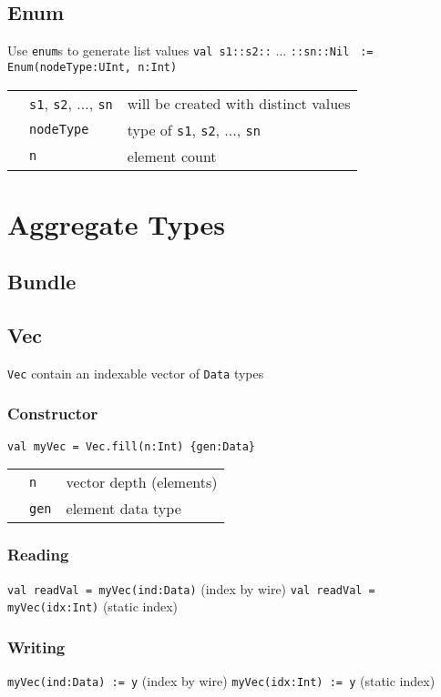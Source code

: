 \documentclass[10pt,landscape]{article}
\begin{document}
\begin{multicols}{3}
\subsection{Enum}
Use \verb$enum$s to generate list values \newline
\verb$val s1::s2::$ ... \verb$::sn::Nil$ \newline
\verb$ := Enum(nodeType:UInt, n:Int)$ \newline
\begin{tabular}{l l l}
& \verb$s1$, \verb$s2$, ..., \verb$sn$ & will be created with distinct values \\
& \verb$nodeType$ & type of \verb$s1$, \verb$s2$, ..., \verb$sn$ \\
& \verb$n$ & element count \\
\end{tabular}

\section{Aggregate Types}
\subsection{Bundle}

\subsection{Vec}
\verb$Vec$ contain an indexable vector of \verb$Data$ types
\subsubsection{Constructor}
\verb$val myVec = Vec.fill(n:Int) {gen:Data}$ \newline
\begin{tabular}{l l l}
& \verb$n$ & vector depth (elements) \\
& \verb$gen$ & element data type \\
\end{tabular}
\subsubsection{Reading}
\verb$val readVal = myVec(ind:Data)$ (index by wire) \newline
\verb$val readVal = myVec(idx:Int)$ (static index) \newline
\subsubsection{Writing}
\verb$myVec(ind:Data) := y$ (index by wire) \newline
\verb$myVec(idx:Int) := y$ (static index) \newline


\end{multicols}
\end{document}
